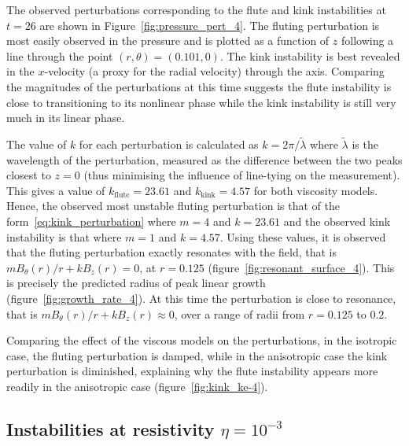 \documentclass[fleqn,usenatbib]{mnras}
\begin{document}
The observed
  perturbations corresponding to the flute and kink
  instabilities at $t=26$ are shown in
  Figure~\ref{fig:pressure_pert_4}. The fluting perturbation is
  most easily observed in the pressure and is plotted as a function of $z$
  following a line through the point $(r, \theta) = (0.101, 0)$. The
  kink instability is best revealed in the $x$-velocity (a proxy for the
  radial velocity) through the axis. Comparing the magnitudes of the
  perturbations at this time suggests the flute
  instability is close to transitioning to its nonlinear phase while
  the kink instability is still very much in its linear
  phase.

The value of $k$ for each perturbation is calculated as $k = 2\pi/\tilde{\lambda}$ where $\tilde{\lambda}$ is the wavelength of the perturbation, measured as the difference between the two peaks closest to $z=0$ (thus minimising the influence of line-tying on the measurement). This gives a value of $k_{\text{flute}}=23.61$ and $k_{\text{kink}}=4.57$ for both viscosity models. Hence, the observed most unstable fluting perturbation is that of the form~\eqref{eq:kink_perturbation} where $m=4$ and $k=23.61$ and the observed kink instability is that where $m=1$ and $k=4.57$. Using these values, it is observed that the fluting perturbation exactly resonates with the field, that is $m B_{\theta}(r)/r + kB_z(r) = 0$, at $r=0.125$ (figure~\ref{fig:resonant_surface_4}). This is precisely the predicted radius of peak linear growth (figure~\ref{fig:growth_rate_4}). At this time the perturbation is close to resonance, that is $m B_{\theta}(r)/r + kB_z(r) \approx 0$, over a range of radii from $r=0.125$ to $0.2$.

Comparing the effect of the viscous models on the perturbations, in the isotropic case, the fluting perturbation is damped, while in the anisotropic case the kink perturbation is diminished, explaining why the flute instability appears more readily in the anisotropic case (figure~\ref{fig:kink_ke-4}).

\subsection{Instabilities at resistivity $\eta=10^{-3}$}
\end{document}
